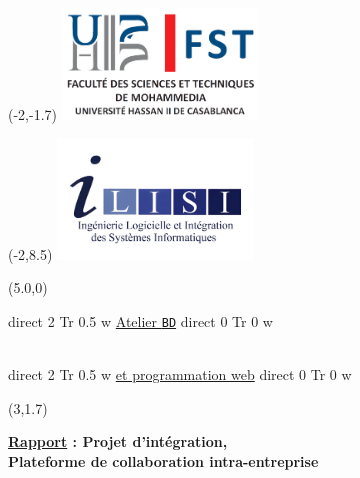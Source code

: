 \documentclass{report}
\newcommand{\textBF}[1]{%
    \pdfliteral direct {2 Tr 0.5 w} %
     #1%
    \pdfliteral direct {0 Tr 0 w}%
}
\begin{document}
\thispagestyle{empty}



\begin{textblock}{4.6}(-2,-1.7)
    \vspace{60mm}
    \includegraphics [width=52mm]{FSTM logo.png}
	\vspace{300mm}
\end{textblock}

\begin{textblock}{4.6}(-2,8.5)
    \includegraphics[width=52mm]{Logo ILISI.png}
	\vspace{300mm}
\end{textblock}

\begin{textblock}{10}(5.0,0)
    \begin{Huge}
        \color{bluetext}
        \textBF{\hspace*{1.6cm}        \underline{Atelier \texttt{BD}}}
        \\
        \textBF{\underline{et programmation web}}
    \end{Huge}
\end{textblock}


\begin{textblock}{10}(3,1.7)
    \begin{center}
    \begin{Huge}
        \textbf{\underline{Rapport} : Projet d’intégration, \\ Plateforme de collaboration intra-entreprise}
    \end{Huge}
    \end{center}
\end{textblock}
\end{document}
